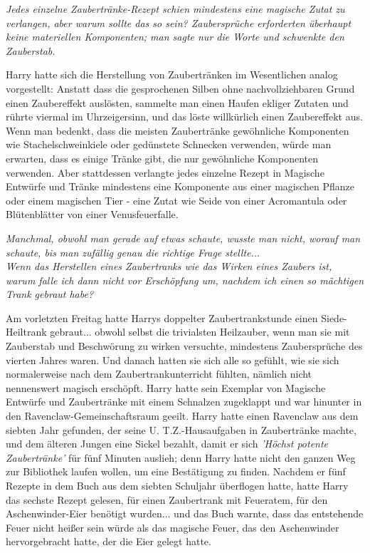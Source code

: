 {\emph{Jedes einzelne Zaubertränke-Rezept schien mindestens eine magische Zutat zu verlangen, aber warum sollte das so sein? Zaubersprüche erforderten überhaupt keine materiellen Komponenten; man sagte nur die Worte und schwenkte den Zauberstab.}

Harry hatte sich die Herstellung von Zaubertränken im Wesentlichen analog vorgestellt: Anstatt dass die gesprochenen Silben ohne nachvollziehbaren Grund einen Zaubereffekt auslösten, sammelte man einen Haufen ekliger Zutaten und rührte viermal im Uhrzeigersinn, und das löste willkürlich einen Zaubereffekt aus. Wenn man bedenkt, dass die meisten Zaubertränke gewöhnliche Komponenten wie Stachelschweinkiele oder gedünstete Schnecken verwenden, würde man erwarten, dass es einige Tränke gibt, die nur gewöhnliche Komponenten verwenden. Aber stattdessen verlangte jedes einzelne Rezept in Magische Entwürfe und Tränke mindestens eine Komponente aus einer magischen Pflanze oder einem magischen Tier - eine Zutat wie Seide von einer Acromantula oder Blütenblätter von einer Venusfeuerfalle.

\emph{Manchmal, obwohl man gerade auf etwas schaute, wusste man nicht, worauf man schaute, bis man zufällig genau die richtige Frage stellte..}.\\ \emph{Wenn das Herstellen eines Zaubertranks wie das Wirken eines Zaubers ist, warum falle ich dann nicht vor Erschöpfung um, nachdem ich einen so mächtigen Trank gebraut habe?}

Am vorletzten Freitag hatte Harrys doppelter Zaubertrankstunde einen Siede-Heiltrank gebraut... obwohl selbst die trivialsten Heilzauber, wenn man sie mit Zauberstab und Beschwörung zu wirken versuchte, mindestens Zaubersprüche des vierten Jahres waren. Und danach hatten sie sich alle so gefühlt, wie sie sich normalerweise nach dem Zaubertrankunterricht fühlten, nämlich nicht nennenswert magisch erschöpft. Harry hatte sein Exemplar von Magische Entwürfe und Zaubertränke mit einem Schnalzen zugeklappt und war hinunter in den Ravenclaw-Gemeinschaftsraum geeilt. Harry hatte einen Ravenclaw aus dem siebten Jahr gefunden, der seine U. T.Z.-Hausaufgaben in Zaubertränke machte, und dem älteren Jungen eine Sickel bezahlt, damit er sich \emph{'Höchst potente Zaubertränke'} für fünf Minuten auslieh; denn Harry hatte nicht den ganzen Weg zur Bibliothek laufen wollen, um eine Bestätigung zu finden. Nachdem er fünf Rezepte in dem Buch aus dem siebten Schuljahr überflogen hatte, hatte Harry das sechste Rezept gelesen, für einen Zaubertrank mit Feueratem, für den Aschenwinder-Eier benötigt wurden... und das Buch warnte, dass das entstehende Feuer nicht heißer sein würde als das magische Feuer, das den Aschenwinder hervorgebracht hatte, der die Eier gelegt hatte.

}
